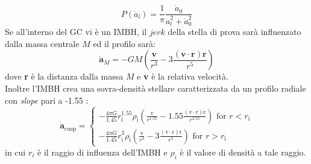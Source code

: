 \begin{equation}
P\left(\dot{a}_{l}\right)=\frac{1}{\pi} \frac{\dot{a}_{0}}{\dot{a}_{l}^{2}+\dot{a}_{0}^{2}}
\end{equation}
Se all'interno del GC vi è un IMBH, il $jerk$ della stella di prova sarà influenzato dalla massa centrale $M$ ed il profilo sarà:
\begin{equation}
\dot{\mathbf{a}}_{M}=-G M\left(\frac{\mathbf{v}}{r^{3}}-3 \frac{(\mathbf{v} \cdot \mathbf{r}) \mathbf{r}}{r^{5}}\right)
\label{eq:jerk_imbh}
\end{equation}
dove \textbf{r} è la distanza dalla massa $M$ e \textbf{v} è la relativa velocità.\\
Inoltre l'IMBH crea una sovra-densità stellare caratterizzata da un profilo radiale con \textit{slope} pari a -1.55 \cite{baum:paper}:
\begin{equation}
\dot{\mathbf{a}}_{\mathrm{cusp}}=\left\{\begin{array}{l}
-\frac{4 \pi G}{1.45} r_{\mathrm{i}}^{1.55} \rho_{\mathrm{i}}\left(\frac{\mathrm{v}}{r^{1.55}}-1.55 \frac{(\mathrm{v} \cdot \mathrm{r}) \mathrm{r}}{r^{3.55}}\right) \text { for } r<r_{\mathrm{i}} \\
-\frac{4 \pi G}{1.45} r_{\mathrm{i}}^{3} \rho_{\mathrm{i}}\left(\frac{\mathrm{v}}{r^{3}}-3 \frac{(\mathrm{v} \cdot \mathrm{r}) \mathrm{r}}{r^{5}}\right) \text { for } r>r_{\mathrm{i}}
\end{array}\right.
\label{eq:jerk_cusp}
\end{equation}
in cui $r_{i}$ è il raggio di influenza dell'IMBH e $\rho_i$ è il valore di densità a tale raggio.

